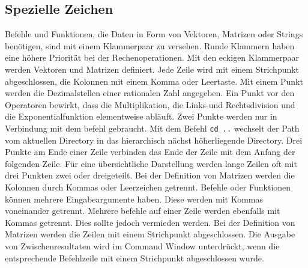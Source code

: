 {\subsection{Spezielle Zeichen}
Befehle und Funktionen, die Daten in Form von Vektoren, Matrizen oder Strings benötigen, sind mit einem Klammerpaar \boxed{\textbf{\texttt{( )}}} zu versehen. Runde Klammern haben eine höhere Priorität bei der Rechenoperationen.
\newline\newline
Mit den eckigen Klammerpaar \boxed{\textbf{\texttt{[ ]}}} werden Vektoren und Matrizen definiert. Jede Zeile wird mit einem Strichpunkt abgeschlossen, die Kolonnen mit einem Komma oder Leertaste.
\newline\newline
Mit einem Punkt  werden die Dezimalstellen einer rationalen Zahl angegeben. Ein Punkt vor den Operatoren bewirkt, dass die Multiplikation, die Links-und Rechtsdivision und die Exponentialfunktion elementweise abläuft. 
\newline\newline
Zwei Punkte  werden nur in Verbindung mit dem befehl  gebraucht. Mit dem Befehl {\color{red}\texttt{cd ..}} wechselt der Path vom aktuellen Directory in das hierarchisch nächst höherliegende Directory.
\newline\newline
Drei Punkte  am Ende einer Zeile verbinden das Ende der Zeile mit dem Anfang der folgenden Zeile. Für eine übersichtliche Darstellung werden lange Zeilen oft mit drei Punkten zwei oder dreigeteilt. 
\newline\newline
Bei der Definition von Matrizen werden die Kolonnen durch Kommas \boxed{\textbf{\texttt{,}}} oder Leerzeichen getrennt. Befehle oder Funktionen können mehrere Eingabeargumente haben. Diese werden mit Kommas voneinander getrennt. Mehrere befehle auf einer Zeile werden ebenfalls mit Kommas getrennt. Dies sollte jedoch vermieden werden. 
\newline\newline
Bei der Definition von Matrizen werden die Zeilen mit einem Strichpunkt \boxed{\textbf{\texttt{;}}} abgeschlossen. Die Ausgabe von Zwischenresultaten wird im Command Window unterdrückt, wenn die entsprechende Befehlzeile mit einem Strichpunkt abgeschlossen wurde.
\newline\newline
}
